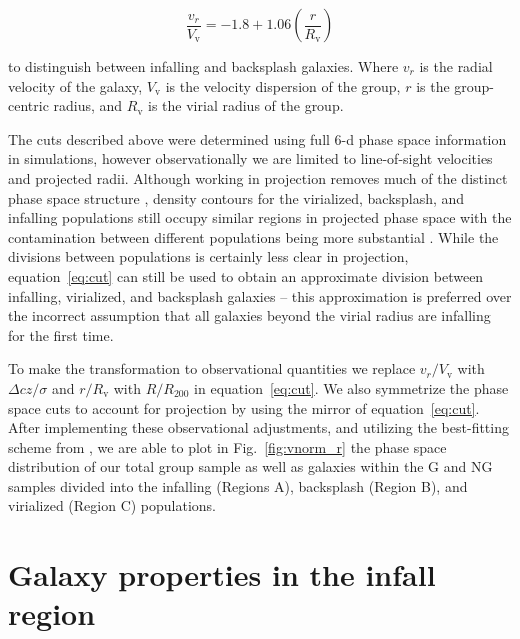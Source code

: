 \documentclass[a4paper,fleqn,usenatbib]{mnras}
\begin{document}
\begin{equation} \label{eq:cut}
  \frac{v_r}{V_\mathrm{v}} = -1.8 + 1.06
  \left(\frac{r}{R_\mathrm{v}}\right)
\end{equation}

\noindent
to distinguish between infalling and backsplash galaxies.  Where $v_r$
is the radial velocity of the galaxy, $V_\mathrm{v}$ is the velocity
dispersion of the group, $r$ is the group-centric radius, and
$R_\mathrm{v}$ is the virial radius of the group.
\par
The cuts described above were determined using full 6-d phase space
information in simulations, however observationally we are limited to
line-of-sight
velocities and projected radii.  Although working in projection
removes much of the distinct phase space structure \citep{oman2013, haines2015},
density contours for the virialized, backsplash, and infalling
populations still occupy similar regions in projected phase space
with the contamination between different populations being more substantial
\citep{mahajan2011}.  While the divisions between populations is
certainly less clear in projection, equation~\ref{eq:cut} can still be
used to obtain an approximate division between infalling, virialized,
and backsplash galaxies -- this approximation is preferred over
the incorrect assumption that all galaxies beyond the virial radius
are infalling for the first time.
\par
To make the transformation to observational quantities we replace
$v_r/V_\mathrm{v}$ with $\Delta cz/\sigma$ and $r/R_\mathrm{v}$ with
$R/R_{200}$ in equation~\ref{eq:cut}.  We also symmetrize the phase
space cuts to account for projection by using the mirror of
equation~\ref{eq:cut}.  After implementing these observational
adjustments, and utilizing the best-fitting scheme from
\citet{mahajan2011}, we are able to plot in Fig.~\ref{fig:vnorm_r} the
phase space distribution of our total group sample as well as galaxies
within the G and NG samples 
divided into the infalling (Regions A), backsplash (Region B), and
virialized (Region C) populations. 


\section{Galaxy properties in the infall region}
\label{sec:infall}
\end{document}
